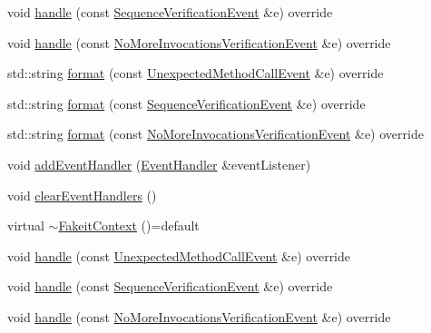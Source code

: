 \begin{DoxyCompactItemize}
void \mbox{\hyperlink{structfakeit_1_1FakeitContext_a6b77f1360c9f8f4165e1152173789d6e}{handle}} (const \mbox{\hyperlink{structfakeit_1_1SequenceVerificationEvent}{Sequence\+Verification\+Event}} \&e) override
\item 
void \mbox{\hyperlink{structfakeit_1_1FakeitContext_a09e2d757900d3c49a1b17694fa0395f1}{handle}} (const \mbox{\hyperlink{structfakeit_1_1NoMoreInvocationsVerificationEvent}{No\+More\+Invocations\+Verification\+Event}} \&e) override
\item 
std\+::string \mbox{\hyperlink{structfakeit_1_1FakeitContext_a4da398d63e45c922606bbd5aaff30f6e}{format}} (const \mbox{\hyperlink{structfakeit_1_1UnexpectedMethodCallEvent}{Unexpected\+Method\+Call\+Event}} \&e) override
\item 
std\+::string \mbox{\hyperlink{structfakeit_1_1FakeitContext_af163c4c51929ef14c1c5529f2f42c40b}{format}} (const \mbox{\hyperlink{structfakeit_1_1SequenceVerificationEvent}{Sequence\+Verification\+Event}} \&e) override
\item 
std\+::string \mbox{\hyperlink{structfakeit_1_1FakeitContext_a49fae6e849a57fff6906a1a313fb4267}{format}} (const \mbox{\hyperlink{structfakeit_1_1NoMoreInvocationsVerificationEvent}{No\+More\+Invocations\+Verification\+Event}} \&e) override
\item 
void \mbox{\hyperlink{structfakeit_1_1FakeitContext_a176ad0df1fcb2758648f2c9b6c8fdd0d}{add\+Event\+Handler}} (\mbox{\hyperlink{structfakeit_1_1EventHandler}{Event\+Handler}} \&event\+Listener)
\item 
void \mbox{\hyperlink{structfakeit_1_1FakeitContext_a65960b8d910f35fa5c3f596f693e5c17}{clear\+Event\+Handlers}} ()
\item 
virtual \mbox{\hyperlink{structfakeit_1_1FakeitContext_adfad726870dfba97246a9ddfddd3a3d5}{$\sim$\+Fakeit\+Context}} ()=default
\item 
void \mbox{\hyperlink{structfakeit_1_1FakeitContext_ac39067234f37a88f6c19440df0bc1b32}{handle}} (const \mbox{\hyperlink{structfakeit_1_1UnexpectedMethodCallEvent}{Unexpected\+Method\+Call\+Event}} \&e) override
\item 
void \mbox{\hyperlink{structfakeit_1_1FakeitContext_a6b77f1360c9f8f4165e1152173789d6e}{handle}} (const \mbox{\hyperlink{structfakeit_1_1SequenceVerificationEvent}{Sequence\+Verification\+Event}} \&e) override
\item 
void \mbox{\hyperlink{structfakeit_1_1FakeitContext_a09e2d757900d3c49a1b17694fa0395f1}{handle}} (const \mbox{\hyperlink{structfakeit_1_1NoMoreInvocationsVerificationEvent}{No\+More\+Invocations\+Verification\+Event}} \&e) override

\end{DoxyCompactItemize}
